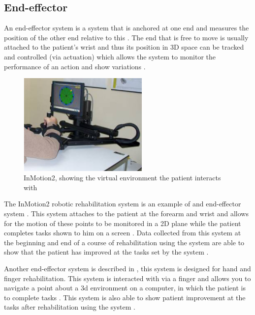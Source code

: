 \documentclass[journal]{IEEEtran}
\begin{document}
\subsection{End-effector}
An end-effector system is a system that is anchored at one end and measures the position of 
the other end relative to this \cite{AdvancesPush}. The end that is free to move is usually attached to the 
patient's wrist and thus its position in 3D space can be tracked and controlled (via actuation) 
which allows the system to monitor the performance of an action and show variations \cite{AdvancesPush}.

\begin{figure}[!h]
\centering
\includegraphics[width=2.5in]{InMotion2.png}
\caption{InMotion2, showing the virtual environment the patient interacts with \cite{QuantativeRobot}}
\label{InMotion2_fig}
\end{figure}

The InMotion2 robotic rehabilitation system is an example of and end-effector system \cite{QuantativeRobot}. 
This system attaches to the patient at the forearm and wrist and allows for the motion of these 
points to be monitored in a 2D plane while the patient completes tasks shown to him on 
a screen \cite{QuantativeRobot}. Data collected from this system at the beginning and end of a course of 
rehabilitation using the system are able to show that the patient has improved at the tasks 
set by the system \cite{QuantativeRobot}.

Another end-effector system is described in \cite{VRHandFingerr}, this system is designed for 
hand and finger rehabilitation. This system is interacted with via a finger and allows you to navigate 
a point about a 3d environment on a computer, in which the patient is to complete tasks \cite{VRHandFinger}.
This system is also able to show patient improvement at the tasks after rehabilitation using the 
system \cite{VRHandFingerr}.
\end{document}
